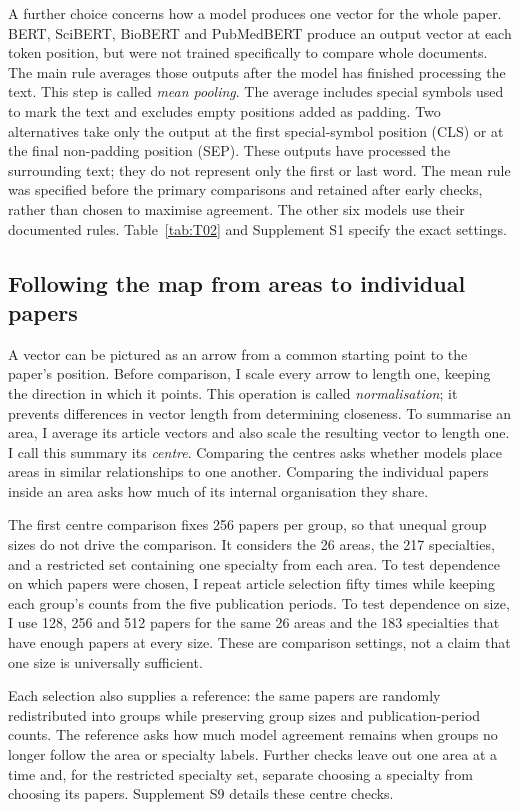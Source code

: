 \documentclass[12pt]{article}
\begin{document}
A further choice concerns how a model produces one vector for the whole paper. BERT, SciBERT, BioBERT and PubMedBERT produce an output vector at each token position, but were not trained specifically to compare whole documents. The main rule averages those outputs after the model has finished processing the text. This step is called \emph{mean pooling}. The average includes special symbols used to mark the text and excludes empty positions added as padding. Two alternatives take only the output at the first special-symbol position (CLS) or at the final non-padding position (SEP). These outputs have processed the surrounding text; they do not represent only the first or last word. The mean rule was specified before the primary comparisons and retained after early checks, rather than chosen to maximise agreement. The other six models use their documented rules. Table~\ref{tab:T02} and Supplement S1 specify the exact settings.


\subsection{Following the map from areas to individual papers}
A vector can be pictured as an arrow from a common starting point to the paper's position. Before comparison, I scale every arrow to length one, keeping the direction in which it points. This operation is called \emph{normalisation}; it prevents differences in vector length from determining closeness. To summarise an area, I average its article vectors and also scale the resulting vector to length one. I call this summary its \emph{centre}. Comparing the centres asks whether models place areas in similar relationships to one another. Comparing the individual papers inside an area asks how much of its internal organisation they share.

The first centre comparison fixes 256 papers per group, so that unequal group sizes do not drive the comparison. It considers the 26 areas, the 217 specialties, and a restricted set containing one specialty from each area. To test dependence on which papers were chosen, I repeat article selection fifty times while keeping each group's counts from the five publication periods. To test dependence on size, I use 128, 256 and 512 papers for the same 26 areas and the 183 specialties that have enough papers at every size. These are comparison settings, not a claim that one size is universally sufficient.

Each selection also supplies a reference: the same papers are randomly redistributed into groups while preserving group sizes and publication-period counts. The reference asks how much model agreement remains when groups no longer follow the area or specialty labels. Further checks leave out one area at a time and, for the restricted specialty set, separate choosing a specialty from choosing its papers. Supplement S9 details these centre checks.
\end{document}

